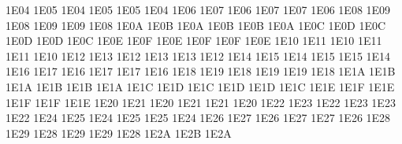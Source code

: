 \setcclcucx 1E04 1E05 1E04 %
\setcclcucx 1E05 1E05 1E04 %
\setcclcucx 1E06 1E07 1E06 %
\setcclcucx 1E07 1E07 1E06 %
\setcclcucx 1E08 1E09 1E08 %
\setcclcucx 1E09 1E09 1E08 %
\setcclcucx 1E0A 1E0B 1E0A %
\setcclcucx 1E0B 1E0B 1E0A %
\setcclcucx 1E0C 1E0D 1E0C %
\setcclcucx 1E0D 1E0D 1E0C %
\setcclcucx 1E0E 1E0F 1E0E %
\setcclcucx 1E0F 1E0F 1E0E %
\setcclcucx 1E10 1E11 1E10 %
\setcclcucx 1E11 1E11 1E10 %
\setcclcucx 1E12 1E13 1E12 %
\setcclcucx 1E13 1E13 1E12 %
\setcclcucx 1E14 1E15 1E14 %
\setcclcucx 1E15 1E15 1E14 %
\setcclcucx 1E16 1E17 1E16 %
\setcclcucx 1E17 1E17 1E16 %
\setcclcucx 1E18 1E19 1E18 %
\setcclcucx 1E19 1E19 1E18 %
\setcclcucx 1E1A 1E1B 1E1A %
\setcclcucx 1E1B 1E1B 1E1A %
\setcclcucx 1E1C 1E1D 1E1C %
\setcclcucx 1E1D 1E1D 1E1C %
\setcclcucx 1E1E 1E1F 1E1E %
\setcclcucx 1E1F 1E1F 1E1E %
\setcclcucx 1E20 1E21 1E20 %
\setcclcucx 1E21 1E21 1E20 %
\setcclcucx 1E22 1E23 1E22 %
\setcclcucx 1E23 1E23 1E22 %
\setcclcucx 1E24 1E25 1E24 %
\setcclcucx 1E25 1E25 1E24 %
\setcclcucx 1E26 1E27 1E26 %
\setcclcucx 1E27 1E27 1E26 %
\setcclcucx 1E28 1E29 1E28 %
\setcclcucx 1E29 1E29 1E28 %
\setcclcucx 1E2A 1E2B 1E2A %
